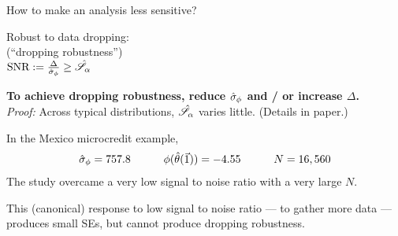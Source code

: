 \begin{frame}[t]{How to make an analysis less sensitive?}

\begin{center}
    Robust to data dropping:\\
    (``dropping robustness'')\\
    \vspace{1em}
    $\textrm{SNR} := \frac{\Delta}{\hat\sigma_{\phi}} \ge \hat{\mathscr{S}}_\alpha$
\end{center}

\vspace{1em}
\hrulefill

\vspace{1em}
\textbf{To achieve dropping robustness,
reduce $\hat\sigma_{\phi}$ and / or increase $\Delta$.\\}
\textit{Proof: }
Across typical distributions, $\hat{\mathscr{S}}_\alpha$ varies little.
(Details in paper.)


\pause
\vspace{1em}
In the Mexico microcredit example,
%
\begin{align*}
%
\noise = \MxNoise
\quad\quad\quad
\thetafun(\thetahat(\onevec)) = \MxBetahat
\quad\quad\quad
N = \MxNobs
%
\end{align*}
%
The study overcame a very low signal to noise ratio with a very large $N$.

\vspace{1em} This (canonical) response to low signal to noise ratio --- to
gather more data --- produces small SEs, but cannot produce dropping
robustness.

\end{frame}
